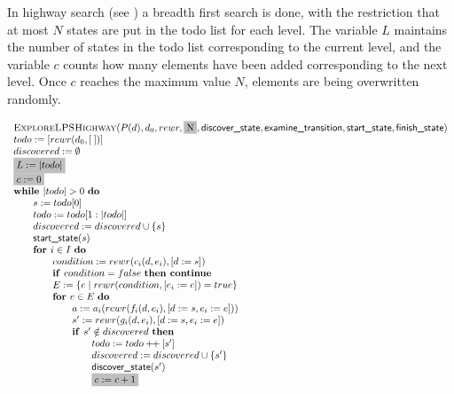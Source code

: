 \documentclass{article}
\newcommand{\concat}{\ensuremath{+\!\!+\:}}
\newcommand{\Space}{\text{\ }}
\newcommand{\If}{\text{\textbf{if }}}
\newcommand{\Do}{\text{\textbf{do }}}
\newcommand{\Then}{\text{\textbf{then }}}
\newcommand{\For}{\text{\textbf{for }}}
\newcommand{\While}{\text{\textbf{while }}}
\newcommand{\Continue}{\text{\textbf{continue }}}
\begin{document}
In highway search (see \cite{DBLP:journals/jlp/EngelsGWW09}) a breadth first search is done, with the restriction that at most $N$ states are put in the todo list for each level. The variable $L$ maintains the number of states in the todo list corresponding to the current level, and the variable $c$ counts how many elements have been added corresponding to the next level. Once $c$ reaches the maximum value $N$,  elements are being overwritten randomly.

\[
\begin{tabular}{l}
\textsc{ExploreLPSHighway}($P(d), d_0, rewr, \colorbox{lightgray}{N}, \textsf{discover\_state}, \textsf{examine\_transition},
\textsf{start\_state}, \textsf{finish\_state})$ \\
$todo := [rewr(d_0, [\:])]$ \\
$discovered := \emptyset$ \\
\colorbox{lightgray}{$L := |todo|$} \\
\colorbox{lightgray}{$c := 0$} \\
$\While |todo| > 0$ \Do \\
\qquad $s := todo[0]$ \\
\qquad $todo := todo[1:|todo|]$ \\
\qquad $discovered := discovered \cup \{s\}$ \\
\qquad $\textsf{start\_state}(s)$ \\
\qquad $\For i \in I  \Space \Do$ \\
\qquad \qquad $condition := rewr(c_i(d, e_i), [d := s])$ \\
\qquad \qquad $\If condition = false  \Space \Then \Continue$ \\
\qquad \qquad $E := \{ e \mid rewr(condition, [e_i := e]) = true \}$ \\
\qquad \qquad $\For e \in E  \Space \Do$ \\
\qquad \qquad \qquad $a := a_i(rewr(f_i(d,e_i), [d:=s,e_i:=e]))$ \\
\qquad \qquad \qquad $s' := rewr(g_i(d,e_i), [d:=s,e_i:=e])$ \\
\qquad \qquad \qquad $\If s' \notin discovered \Space \Then$ \\
\qquad \qquad \qquad \qquad $todo := todo \concat [s']$ \\
\qquad \qquad \qquad \qquad $discovered := discovered \cup \{s'\}$ \\
\qquad \qquad \qquad \qquad $\textsf{discover\_state}(s')$ \\
\qquad \qquad \qquad \qquad \colorbox{lightgray}{$c := c + 1$} \\

\end{tabular}\]
\end{document}
